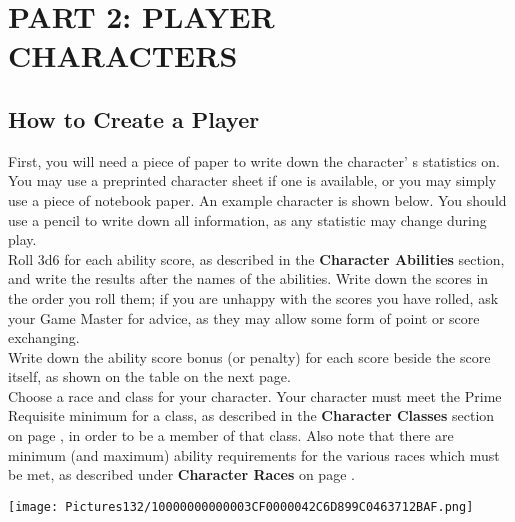 \documentclass[a4paper,twoside,openany,10pt]{book}
\begin{document}
\pagebreak

\section{PART 2: PLAYER CHARACTERS}\label{part-2-player-characters}

\begin{multicols}{2}

\subsection{How to Create a Player}

\label{how-to-create-a-player-character}

First, you will need a piece of paper to write down the character' s statistics on. You may use a preprinted character sheet if one is available, or you may simply use a piece of notebook paper. An example character is shown below. You should use a pencil to write down all information, as any statistic may change during play.\\

Roll 3d6 for each ability score, as described in the \textbf{Character Abilities} section, and write the results after the names of the abilities. Write down the scores in the order you roll them; if you are unhappy with the scores you have rolled, ask your Game Master for advice, as they may allow some form of point or score exchanging.\\

Write down the ability score bonus (or penalty) for each score beside the score itself, as shown on the table on the next page.\\

Choose a race and class for your character. Your character must meet the Prime Requisite minimum for a class, as described in the \textbf{Character Classes} section on page \hyperlink{character-classes}{\pageref{character-classes}}, in order to be a member of that class. Also note that there are minimum (and maximum) ability requirements for the various races which must be met, as described under \textbf{Character Races} on page \hyperlink{character-races}{\pageref{character-races}}.\\

\begin{flushleft}
	\texttt{[image: Pictures132/10000000000003CF0000042C6D899C0463712BAF.png]}
\end{flushleft}\medskip


\end{multicols}
\end{document}
